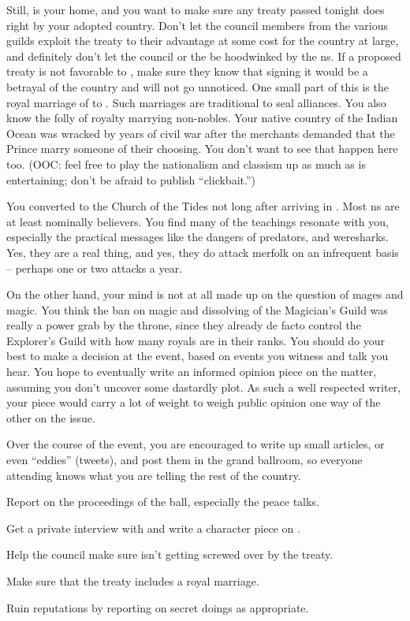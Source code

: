 \documentclass[char]{NeptuneBall}
\begin{document}
Still, \pAtlantis{} is your home, and you want to make sure any treaty passed tonight does right by your adopted country. Don't let the council members from the various guilds exploit the treaty to their advantage at some cost for the country at large, and definitely don't let the council or the \cKing{\King} be hoodwinked by the \pPacifica{}ns. If a proposed treaty is not favorable to \pAtlantis{}, make sure they know that signing it would be a betrayal of the country and will not go unnoticed.  One small part of this is the royal marriage of \cPrincess{} to \cPrince{}. Such marriages are traditional to seal alliances. You also know the folly of royalty marrying non-nobles. Your native country of the Indian Ocean was wracked by years of civil war after the merchants demanded that the Prince marry someone of their choosing. You don't want to see that happen here too. (OOC: feel free to play the nationalism and classism up as much as is entertaining; don't be afraid to publish ``clickbait.'')

You converted to the Church of the Tides not long after arriving in \pAtlantis{}. Most \pAtlantis{}ns are at least nominally believers. You find many of the teachings resonate with you, especially the practical messages like the dangers of predators, and weresharks. Yes, they are a real thing, and yes, they do attack merfolk on an infrequent basis -- perhaps one or two attacks a year.

On the other hand, your mind is not at all made up on the question of mages and magic. You think the ban on magic and dissolving of the Magician's Guild was really a power grab by the throne, since they already de facto control the Explorer’s Guild with how many royals are in their ranks. You should do your best to make a decision at the event, based on events you witness and talk you hear. You hope to eventually write an informed opinion piece on the matter, assuming you don't uncover some dastardly plot. As such a well respected writer, your piece would carry a lot of weight to weigh public opinion one way of the other on the issue.

Over the course of the event, you are encouraged to write up small articles, or even “eddies” (tweets), and post them in the grand ballroom, so everyone attending knows what you are telling the rest of the country.

\begin{itemz}[Goals]
  \item Report on the proceedings of the ball, especially the peace talks.
	\item Get a private interview with \cPrince{} and write a character piece on \cPrince{\them}.
	\item Help the council make sure \pAtlantis{} isn't getting screwed over by the treaty.
	\item Make sure that the treaty includes a royal marriage.
	\item Ruin reputations by reporting on secret doings as appropriate.
\end{itemz}
\end{document}
